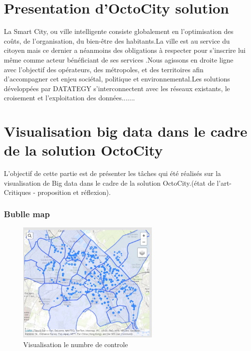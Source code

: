 \documentclass[french, a4paper, 12pt]{report}
\begin{document}
\section{Presentation d’OctoCity solution}
La Smart City, ou ville intelligente consiste globalement en l’optimisation des coûts, de l’organisation, du bien-être des habitants.La ville est au service du citoyen mais ce dernier a néanmoins des obligations à respecter pour s’inscrire lui même comme acteur bénéficiant de ses services .Nous agissons en droite ligne avec l’objectif des opérateurs, des métropoles, et des territoires afin d’accompagner cet enjeu sociétal, politique et environnemental.Les solutions développées par DATATEGY s’interconnectent avec les réseaux existants, le croisement et l’exploitation des données.......
\section{Visualisation big data dans le cadre de la solution OctoCity}
L'objectif de cette partie est de présenter les tâches qui été réalisés sur la visualisation de Big data dans le cadre de la solution OctoCity.(état de l’art- Critiques - proposition et réflexion).

\subsubsection{Bublle map}
\begin{figure}[!htp]
    \centering
    \includegraphics[height=6cm]{images/datategy-bubble-map.jpg}
    \scriptsize{}
    \caption{Visualisation le numbre de controle}
    \label{fig:3.1}
\end{figure}
\end{document}
